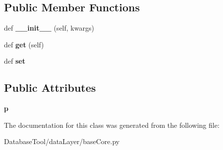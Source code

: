 \subsection*{Public Member Functions}
\begin{DoxyCompactItemize}
\item 
\mbox{\label{classMIS_1_1DatabaseTool_1_1dataLayer_1_1baseCore_1_1filePath_a1f4951cb2e4e03ccd673116be283215e}} 
def {\bfseries \+\_\+\+\_\+init\+\_\+\+\_\+} (self, kwargs)
\item 
\mbox{\label{classMIS_1_1DatabaseTool_1_1dataLayer_1_1baseCore_1_1filePath_a6583bf787b5336974cb7be8aa5cae279}} 
def {\bfseries get} (self)
\item 
\mbox{\label{classMIS_1_1DatabaseTool_1_1dataLayer_1_1baseCore_1_1filePath_ab8a067c45c9b0ea4c79020cbf733adf0}} 
def {\bfseries set}
\end{DoxyCompactItemize}
\subsection*{Public Attributes}
\begin{DoxyCompactItemize}
\item 
\mbox{\label{classMIS_1_1DatabaseTool_1_1dataLayer_1_1baseCore_1_1filePath_aac9fae056d543bab6dc94c1aaab103f7}} 
{\bfseries p}
\end{DoxyCompactItemize}


The documentation for this class was generated from the following file\+:\begin{DoxyCompactItemize}
\item 
Database\+Tool/data\+Layer/base\+Core.\+py\end{DoxyCompactItemize}
